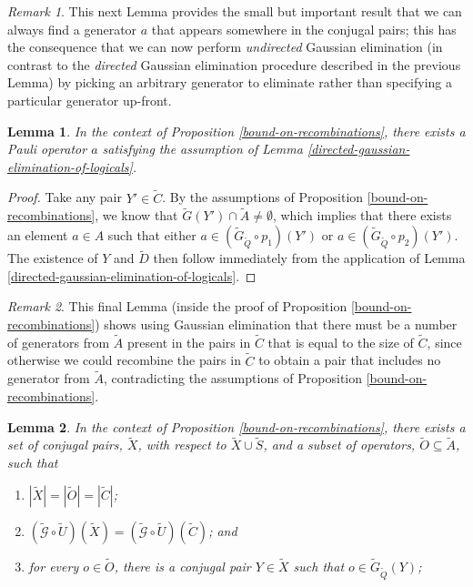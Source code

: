 \documentclass[12pt]{amsbook}
\theoremstyle{plain}
\newtheorem{lemma}{Lemma}
\theoremstyle{definition}
\theoremstyle{remark}
\newtheorem{remark}{Remark}
\newcommand{\set}{\tilde}
\newcommand{\genfun}{\tilde{\mathcal{G}}}
\begin{document}
\begin{remark}
This next Lemma provides the small but important result that we can always find a generator $a$ that appears somewhere in the conjugal pairs;  this has the consequence that we can now perform \emph{undirected} Gaussian elimination (in contrast to the \emph{directed} Gaussian elimination procedure described in the previous Lemma) by picking an arbitrary generator to eliminate rather than specifying a particular generator up-front.
\end{remark}

\begin{lemma}
\label{undirected-gaussian-elimination-of-logicals}
In the context of Proposition \ref{bound-on-recombinations}, there exists a Pauli operator $a$ satisfying the assumption of Lemma \ref{directed-gaussian-elimination-of-logicals}.
\end{lemma}

\begin{proof}
Take any pair $Y'\in\set C$.  By the assumptions of Proposition \ref{bound-on-recombinations}, we know that $\set G(Y')\cap \set A \ne \emptyset$, which implies that there exists an element $a\in A$ such that either $a\in (\set G_{\set Q}\circ p_1)(Y')$ or $a\in (\set G_{\set Q}\circ p_2)(Y')$.  The existence of $Y$ and $\set D$ then follow immediately from the application of Lemma \ref{directed-gaussian-elimination-of-logicals}.
\end{proof}
\begin{remark}
This final Lemma (inside the proof of Proposition \ref{bound-on-recombinations}) shows using Gaussian elimination that there must be a number of generators from $\set A$ present in the pairs in $\set C$ that is equal to the size of $\set C$, since otherwise we could recombine the pairs in $\set C$ to obtain a pair that includes no generator from $\set A$, contradicting the assumptions of Proposition \ref{bound-on-recombinations}.
\end{remark}
\begin{lemma}
\label{elimination-to-create-subset}
In the context of Proposition \ref{bound-on-recombinations}, there exists a set of conjugal pairs, $\set X$, with respect to $\set X\cup\set S$, and a subset of operators, $\set O\subseteq \set A$, such that
\begin{enumerate}
\item $|\set X|=|\set O|=|\set C|$;
\item $(\genfun\circ\set U)(\set X)=(\genfun\circ\set U)(\set C)$; and
\item for every $o\in\set O$, there is a conjugal pair $Y\in\set X$ such that $o\in\set G_{\set Q}(Y)$;
\end{enumerate}
\end{lemma}
\end{document}
